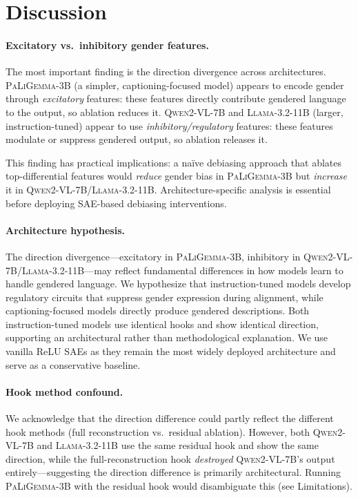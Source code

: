 \documentclass[11pt,a4paper]{article}
\newcommand{\modelname}[1]{\textsc{#1}}
\newcommand{\pali}{\modelname{PaLiGemma-3B}}
\newcommand{\qwen}{\modelname{Qwen2-VL-7B}}
\newcommand{\llama}{\modelname{Llama-3.2-11B}}
\newcommand{\sae}{SAE}
\newcommand{\saes}{SAEs}
\begin{document}
\section{Discussion}
\label{sec:discussion}

\paragraph{Excitatory vs.\ inhibitory gender features.}
The most important finding is the direction divergence across architectures.
\pali{} (a simpler, captioning-focused model) appears to encode gender through \emph{excitatory} features: these features directly contribute gendered language to the output, so ablation reduces it.
\qwen{} and \llama{} (larger, instruction-tuned) appear to use \emph{inhibitory/regulatory} features: these features modulate or suppress gendered output, so ablation releases it.

This finding has practical implications: a na\"ive debiasing approach that ablates top-differential features would \emph{reduce} gender bias in \pali{} but \emph{increase} it in \qwen{}/\llama{}.
Architecture-specific analysis is essential before deploying \sae{}-based debiasing interventions.

\paragraph{Architecture hypothesis.}
The direction divergence---excitatory in \pali{}, inhibitory in \qwen{}/\llama{}---may reflect fundamental differences in how models learn to handle gendered language.
We hypothesize that instruction-tuned models develop regulatory circuits that suppress gender expression during alignment, while captioning-focused models directly produce gendered descriptions.
Both instruction-tuned models use identical hooks and show identical direction, supporting an architectural rather than methodological explanation.
We use vanilla ReLU \saes{} as they remain the most widely deployed architecture and serve as a conservative baseline.

\paragraph{Hook method confound.}
We acknowledge that the direction difference could partly reflect the different hook methods (full reconstruction vs.\ residual ablation).
However, both \qwen{} and \llama{} use the same residual hook and show the same direction, while the full-reconstruction hook \emph{destroyed} \qwen{}'s output entirely---suggesting the direction difference is primarily architectural.
Running \pali{} with the residual hook would disambiguate this (see Limitations).
\end{document}
